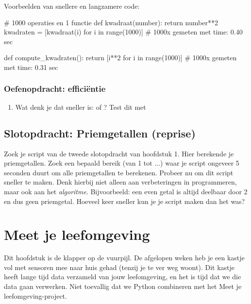 \documentclass[a4paper,11pt, fleqn]{article}
\newcommand{\ditwc}{Naam van het huidige werkcollege}
\begin{document}
Voorbeelden van snellere en langzamere code:

\begin{python}
# 1000 operaties en 1 functie
def kwadraat(number):
    return number**2
kwadraten = [kwadraat(i) for i in range(1000)]
# 1000x gemeten met time: 0.40 sec

def compute_kwadraten():
    return [i**2 for i in range(1000)]
# 1000x gemeten met time: 0.31 sec
\end{python}

\subsubsection*{Oefenopdracht: effici\"entie}
\begin{enumerate}[label=(\alph*)]
\item Wat denk je dat sneller is:  of ? Test dit met 
\end{enumerate}


\subsection{Slotopdracht: Priemgetallen (reprise)}
Zoek je script van de tweede slotopdracht van hoofdstuk 1. Hier berekende je priemgetallen. Zoek een bepaald bereik (van 1 tot ...) waar je script ongeveer 5 seconden duurt om alle priemgetallen te berekenen. Probeer nu om dit script sneller te maken. Denk hierbij niet alleen aan verbeteringen in programmeren, maar ook aan het {\it algoritme}. Bijvoorbeeld: een even getal is altijd deelbaar door 2 en dus geen priemgetal. Hoeveel keer sneller kun je je script maken dan het was?

\clearpage
\fi

\renewcommand{\ditwc}{Meet je leefomgeving}
\section[Meet je leefomgeving]{\ditwc}
Dit hoofdstuk is de klapper op de vuurpijl. De afgelopen weken heb je een kastje vol met sensoren mee naar huis gehad (tenzij je te ver weg woont). Dit kastje heeft lange tijd data verzameld van jouw leefomgeving, en het is tijd dat we die data gaan verwerken. Niet toevallig dat we Python combineren met het Meet je leefomgeving-project. 
\end{document}
